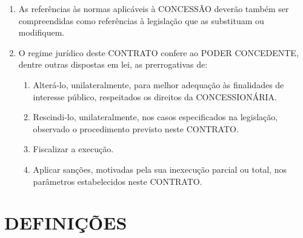 \documentclass[a4paper,11pt]{report} %
\begin{document}
\begin{enumerate}
\item \label{itm:DS3Z} As referências às normas aplicáveis à CONCESSÃO deverão também ser compreendidas como referências à legislação que as substituam ou modifiquem.
        	
\item \label{itm:N2VY} O regime jurídico deste CONTRATO confere ao PODER CONCEDENTE, dentre outras dispostas em lei, as prerrogativas de:

\begin{enumerate}[label*=\arabic*.]
\item \label{itm:Z4JK} Alterá-lo, unilateralmente, para melhor adequação às finalidades de interesse público, respeitados os direitos da CONCESSIONÁRIA.
\item \label{itm:PK35} Rescindi-lo, unilateralmente, nos casos especificados na legislação, observado o procedimento previsto neste CONTRATO.
\item \label{itm:CQ8W} Fiscalizar a execução.
\item \label{itm:P344} Aplicar sanções, motivadas pela sua inexecução parcial ou total, nos parâmetros estabelecidos neste CONTRATO.
\end{enumerate}

\end{enumerate}

\section{DEFINIÇÕES}
\label{sec:Q7MS}
\end{document}
